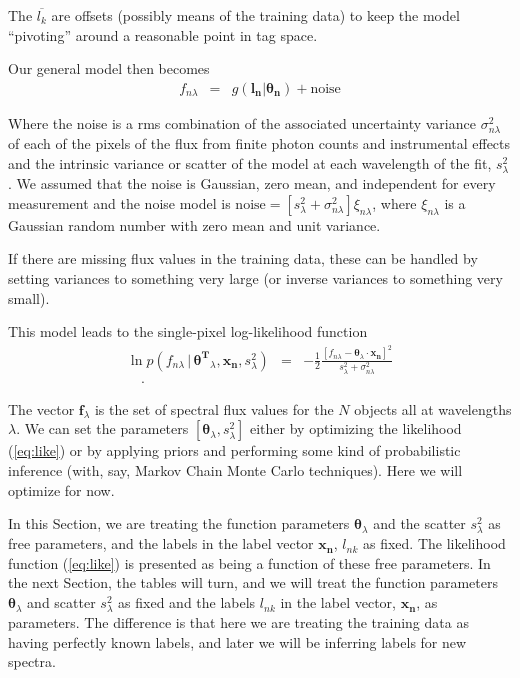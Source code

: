 \documentclass[12pt, preprint]{aastex}
\newcommand{\sectionname}{Section}
\newcommand{\set}[1]{\bm{#1}}
\newcommand{\mean}[1]{\overline{#1}}
\newcommand{\given}{\,|\,}
\begin{document}
The $\mean{l_k}$ are offsets (possibly means of the training data) to keep the model ``pivoting'' around a reasonable point in tag space.


Our general model then becomes
\begin{eqnarray}
f_{n\lambda} &=&
g(\boldsymbol{l_n} |  \boldsymbol{\theta_n}) + \mbox{noise}
\label{eq:linear}
\end{eqnarray}

Where the noise is a rms combination of the associated uncertainty variance
$\sigma_{n\lambda}^2$ of each of the pixels of the flux from finite photon counts and instrumental effects and the intrinsic variance or scatter of the model at each wavelength of the fit, $s_\lambda^2$. We assumed that the noise is Gaussian, zero mean, and independent for every measurement and the noise model is $\mbox{noise} = [s_\lambda^2+ \sigma_{n\lambda}^2]\xi_{n\lambda}$, where $\xi_{n\lambda}$ is a Gaussian random number with zero mean and unit
variance.

If there are missing flux values in the training data, these can be
handled by setting variances to something very large (or inverse
variances to something very small).

This model leads to the single-pixel log-likelihood function 
\begin{eqnarray}
\ln p(f_{n\lambda}\given\set{\theta^T}_\lambda, \boldsymbol{x_n}, s_\lambda^2) &=&
 -\frac{1}{2}\frac{[f_{n\lambda} - \set{\theta}_\lambda \cdot \set{x_n}]^2}{s_\lambda^2 + \sigma_{n\lambda}^2}
\label{eq:like}\\
\quad.
\end{eqnarray}


The vector $\set{f}_\lambda$ is the set of spectral flux values for
the $N$ objects all at wavelengths $\lambda$.
We can set the parameters $[\set{\theta}_\lambda,s_\lambda^2]$ either by
optimizing the likelihood (\ref{eq:like}) or by applying priors and
performing some kind of probabilistic inference (with, say, Markov
Chain Monte Carlo techniques).
Here we will optimize for now.

In this \sectionname, we are treating the function parameters
$\set{\theta}_\lambda$ and the scatter $s_\lambda^2$ as free parameters, and the
labels in the label vector $\set{x_n}$, $l_{nk}$ as fixed.
The likelihood function (\ref{eq:like}) is presented as being a
function of these free parameters.
In the next \sectionname, the tables will turn, and we will treat the
function parameters $\set{\theta}_\lambda$ and scatter $s_{\lambda}^2$ as fixed and
the labels $l_{nk}$ in the label vector, $\set{x_n}$, as parameters.
The difference is that here we are treating the training data as
having perfectly known labels, and later we will be inferring labels for
new spectra.
\end{document}

